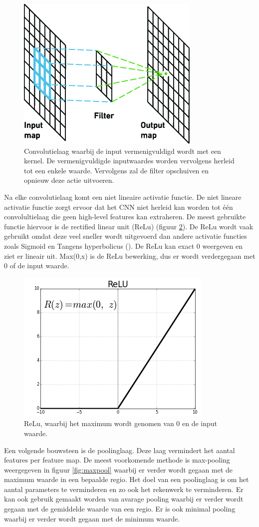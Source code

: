 \begin{figure}[!ht]
	\centering
	\includegraphics[width=0.35\linewidth]{fig/convolution layer.png}
	\caption{Convolutielaag waarbij de input vermenigvuldigd wordt met een kernel. De vermenigvuldigde inputwaardes worden vervolgens herleid tot een enkele waarde. Vervolgens zal de filter opschuiven en opnieuw deze actie uitvoeren.}
	\label{fig:conv_laag}
\end{figure}

Na elke convolutielaag komt een niet lineaire activatie functie.
De niet lineare activatie functie zorgt ervoor dat het CNN niet herleid kan worden tot \'e\'en convolultielaag die geen high-level features kan extraheren. 
De meest gebruikte functie hiervoor is de rectified linear unit (ReLu) (figuur \ref{fig:relu}). 
De ReLu wordt vaak gebruikt omdat deze veel sneller wordt uitgevoerd dan andere activatie functies zoals Sigmoid en Tangens hyperbolicus (\cite{Krizhevsky_act_2017}).
De ReLu kan exact 0 weergeven en ziet er lineair uit. 
Max(0,x) is de ReLu bewerking, dus er wordt verdergegaan met 0 of de input waarde. 

\begin{figure}[!ht]
 	\centering
 	\includegraphics[width=0.35\linewidth]{fig/ReLu.png}
 	\caption{ReLu, waarbij het maximum wordt genomen van 0 en de input waarde.}
 	\label{fig:relu}
\end{figure}

Een volgende bouwsteen is de poolinglaag.
Deze laag vermindert het aantal features per feature map. 
De meest voorkomende methode is max-pooling weergegeven in figuur \ref{fig:maxpool} waarbij er verder wordt gegaan met de maximum waarde in een bepaalde regio. 
Het doel van een poolinglaag is om het aantal parameters te verminderen en zo ook het rekenwerk te verminderen. 
Er kan ook gebruik gemaakt worden van avarage pooling waarbij er verder wordt gegaan met de gemiddelde waarde van een regio. 
Er is ook minimal pooling waarbij er verder wordt gegaan met de minimum waarde.

